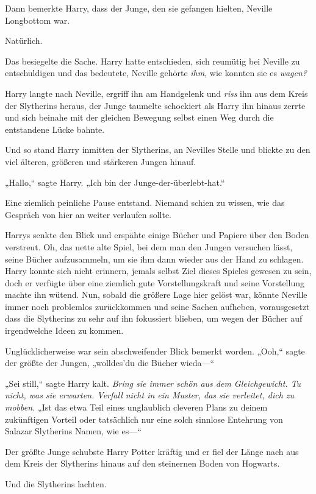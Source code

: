 {Dann bemerkte Harry, dass der Junge, den sie gefangen hielten, Neville Longbottom war.

Natürlich.

Das besiegelte die Sache. Harry hatte entschieden, sich reumütig bei Neville zu entschuldigen und das bedeutete, Neville gehörte \emph{ihm}, wie konnten sie es \emph{wagen?}

Harry langte nach Neville, ergriff ihn am Handgelenk und \emph{riss} ihn aus dem Kreis der Slytherins heraus, der Junge taumelte schockiert als Harry ihn hinaus zerrte und sich beinahe mit der gleichen Bewegung selbst einen Weg durch die entstandene Lücke bahnte.

Und so stand Harry inmitten der Slytherins, an Nevilles Stelle und blickte zu den viel älteren, größeren und stärkeren Jungen hinauf.

„Hallo,“ sagte Harry. „Ich bin der Junge-der-überlebt-hat.“

Eine ziemlich peinliche Pause entstand. Niemand schien zu wissen, wie das Gespräch von hier an weiter verlaufen sollte.

Harrys senkte den Blick und erspähte einige Bücher und Papiere über den Boden verstreut. Oh, das nette alte Spiel, bei dem man den Jungen versuchen lässt, seine Bücher aufzusammeln, um sie ihm dann wieder aus der Hand zu schlagen. Harry konnte sich nicht erinnern, jemals selbst Ziel dieses Spieles gewesen zu sein, doch er verfügte über eine ziemlich gute Vorstellungskraft und seine Vorstellung machte ihn wütend. Nun, sobald die größere Lage hier gelöst war, könnte Neville immer noch problemlos zurückkommen und seine Sachen aufheben, vorausgesetzt dass die Slytherins zu sehr auf ihn fokussiert blieben, um wegen der Bücher auf irgendwelche Ideen zu kommen.

Unglücklicherweise war sein abschweifender Blick bemerkt worden. „Ooh,“ sagte der größte der Jungen, „wolldes'du die Bücher wieda—“

„Sei still,“ sagte Harry kalt. \emph{Bring sie immer schön aus dem Gleichgewicht. Tu nicht, was sie erwarten. Verfall nicht in ein Muster, das sie verleitet, dich zu mobben.} „Ist das etwa Teil eines unglaublich cleveren Plans zu deinem zukünftigen Vorteil oder tatsächlich nur eine solch sinnlose Entehrung von Salazar Slytherins Namen, wie es—“

Der größte Junge schubste Harry Potter kräftig und er fiel der Länge nach aus dem Kreis der Slytherins hinaus auf den steinernen Boden von Hogwarts.

Und die Slytherins lachten.

}
